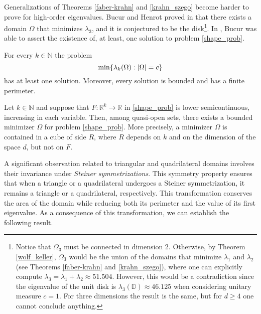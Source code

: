 Generalizations of Theorems \ref{faber-krahn} and \ref{krahn_szego} become harder to prove for high-order eigenvalues. Bucur and Henrot proved in \cite{henrot2000minimization} that there exists a domain \(\Omega\) that minimizes \(\lambda_3\), and it is conjectured to be the disk\footnote{Notice that \(\Omega_3\) must be connected in dimension \(2\). Otherwise, by Theorem \ref{wolf_keller}, \(\Omega_3\) would be the union of the domains that minimize \(\lambda_1\) and \(\lambda_2\) (see Theorems \ref{faber-krahn} and \ref{krahn_szego}), where one can explicitly compute \(\lambda_3 = \lambda_1 + \lambda_2 \approx 51.504\). However, this would be a contradiction since the eigenvalue of the unit disk is \(\lambda_3(\mathbb{D}) \approx 46.125\) when considering unitary measure \(c=1\). For three dimensions the result is the same, but for \(d \geq 4\) one cannot conclude anything.}.
In \cite{bucur2012minimization}, Bucur was able to assert the existence of, at least, one solution to problem \eqref{shape_prob}.
\begin{theorem}[Bucur]
    For every \(k \in \mathbb{N}\) the problem
    \[
    \min\{\lambda_k(\Omega): \abs{\Omega} = c\}
    \]
    has at least one solution. Moreover, every solution is bounded and has a finite perimeter.
\end{theorem}

\begin{theorem}
    Let \(k \in \mathbb{N}\) and suppose that \(F:\mathbb{R}^k \rightarrow \mathbb{R}\) in \eqref{shape_prob} is lower semicontinuous, increasing in each variable. Then, among quasi-open sets, there exists a bounded minimizer \(\Omega\) for problem \eqref{shape_prob}. More precisely, a minimizer \(\Omega\) is contained in a cube of side \(R\), where \(R\) depends on \(k\) and on the dimension of the space \(d\), but not on \(F\).
\end{theorem}

A significant observation related to triangular and quadrilateral domains involves their invariance under \textit{Steiner symmetrizations}. This symmetry property ensures that when a triangle or a quadrilateral undergoes a Steiner symmetrization, it remains a triangle or a quadrilateral, respectively. This transformation conserves the area of the domain while reducing both its perimeter and the value of its first eigenvalue. As a consequence of this transformation, we can establish the following result.

